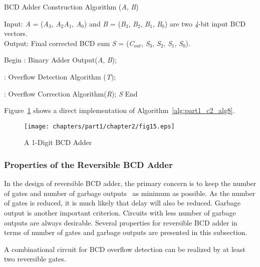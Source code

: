 \begin{algorithm}[!tbh]
\caption{BCD Adder Construction Algorithm ({\it A}, {\it B})}
\label{alg:part1_c2_alg8}
Input: {\it A }= ({\it A}${}_{3}$, {\it A}${}_{2}${\it A}${}_{1}$, {\it A}${}_{0}$) and {\it B }= ({\it B}${}_{3}$, {\it B}${}_{2}$, {\it B}${}_{1}$, {\it B}${}_{0}$) are two {\it 4}-bit input BCD vectors.\\
Output: Final corrected BCD sum {\it S }= ({\it C}${}_{out}$, {\it S}${}_{3}$, {\it S}${}_{2}$, {\it S}${}_{1}$, {\it S}${}_{0}$).\\
\begin{algorithmic}[1]
\STATE Begin
: Binary Adder Output({\it A}, {\it B});

: Overflow Detection Algorithm ({\it T});

: Overflow Correction Algorithm({\it R});
 {\it S}
\STATE End
\end{algorithmic}
\end{algorithm}

\begin{example}\textnormal{ Figure~\ref{fig:p1_c2_fig15} shows a direct implementation of Algorithm~\ref{alg:part1_c2_alg8}.}
\end{example}

\begin{figure}[!tbh]
\centering
\texttt{[image: chapters/part1/chapter2/fig15.eps]}
\caption{A 1-Digit BCD Adder}
\label{fig:p1_c2_fig15}
\end{figure}

\subsubsection{Properties of the Reversible BCD Adder}

In the design of reversible BCD adder, the primary concern is to keep the number of gates and number of garbage outputs~ as minimum as possible. As the number of gates is reduced, it is much likely that delay will also be reduced. Garbage output is another important criterion. Circuits with less number of garbage outputs are always desirable. Several properties for reversible BCD adder in terms of number of gates and garbage outputs are presented in this subsection.
\begin{property}\label{p_c2_l_3}\textnormal{
A combinational circuit for BCD overflow detection can be realized by at least two reversible gates.}
\end{property}

